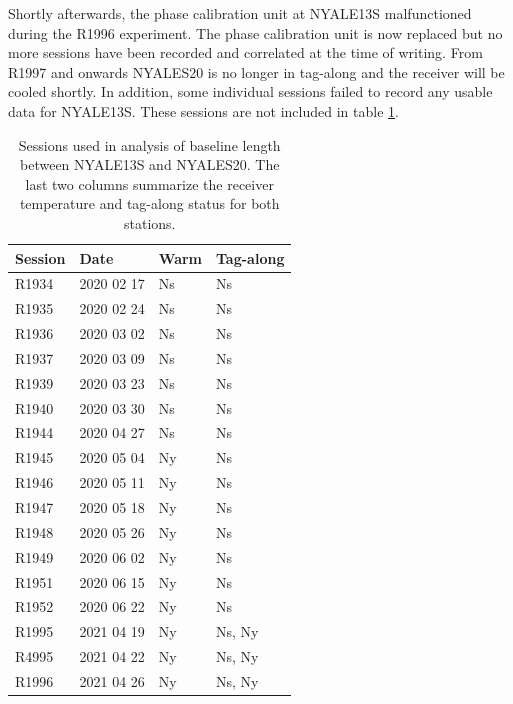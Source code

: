 \documentclass[natbib,twocolumn,twoside]{svmultiag}
\begin{document}
Shortly afterwards,
the phase calibration unit at NYALE13S malfunctioned during the R1996 experiment. The phase calibration unit is now replaced
but no more sessions have been recorded and correlated at the time of writing.  From R1997 and onwards NYALES20
is no longer in tag-along and the receiver will be cooled shortly. In addition, some individual sessions failed to 
record any usable data for NYALE13S. These sessions are not included in table \ref{tab:sessions}.

\begin{table}
	\begin{tabularx}{\columnwidth}{X|X|X|X}
	Session & Date & Warm & Tag-along\\
	\hline
	R1934 & 2020 02 17 & Ns & Ns\\
	R1935 & 2020 02 24 & Ns & Ns\\
	R1936 & 2020 03 02 & Ns & Ns\\
	R1937 & 2020 03 09 & Ns & Ns\\
	R1939 & 2020 03 23 & Ns & Ns\\
	R1940 & 2020 03 30 & Ns & Ns\\
	R1944 & 2020 04 27 & Ns & Ns\\
	R1945 & 2020 05 04 & Ny & Ns\\
	R1946 & 2020 05 11 & Ny & Ns\\
	R1947 & 2020 05 18 & Ny & Ns\\
	R1948 & 2020 05 26 & Ny & Ns\\
	R1949 & 2020 06 02 & Ny & Ns\\
	R1951 & 2020 06 15 & Ny & Ns\\
	R1952 & 2020 06 22 & Ny & Ns\\
	R1995 & 2021 04 19 & Ny & Ns, Ny\\
	R4995 & 2021 04 22 & Ny & Ns, Ny\\
	R1996 & 2021 04 26 & Ny & Ns, Ny\\
	\hline
	\end{tabularx}
\caption{{Sessions used in analysis of baseline length between NYALE13S and NYALES20. The last two columns summarize the 
receiver temperature and tag-along status for both stations.}}
\label{tab:sessions}
\end{table}
\end{document}
